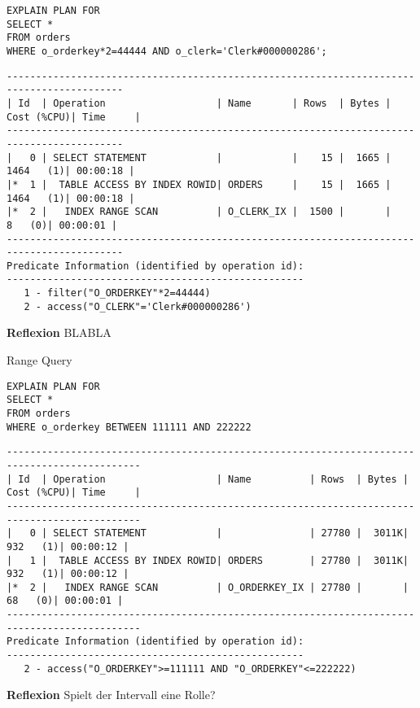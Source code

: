 \documentclass[10pt]{article}
\begin{document}
\begin{lstlisting}[style=sql]
EXPLAIN PLAN FOR
SELECT *
FROM orders
WHERE o_orderkey*2=44444 AND o_clerk='Clerk#000000286';
\end{lstlisting}
\begin{lstlisting}[style=queryexecutionplan]
------------------------------------------------------------------------------------------
| Id  | Operation                   | Name       | Rows  | Bytes | Cost (%CPU)| Time     |
------------------------------------------------------------------------------------------
|   0 | SELECT STATEMENT            |            |    15 |  1665 |  1464   (1)| 00:00:18 |
|*  1 |  TABLE ACCESS BY INDEX ROWID| ORDERS     |    15 |  1665 |  1464   (1)| 00:00:18 |
|*  2 |   INDEX RANGE SCAN          | O_CLERK_IX |  1500 |       |     8   (0)| 00:00:01 |
------------------------------------------------------------------------------------------
Predicate Information (identified by operation id):
---------------------------------------------------
   1 - filter("O_ORDERKEY"*2=44444)
   2 - access("O_CLERK"='Clerk#000000286')
\end{lstlisting}
\textbf{Reflexion} \newline
BLABLA

Range Query
\begin{lstlisting}[style=sql]
EXPLAIN PLAN FOR
SELECT *
FROM orders
WHERE o_orderkey BETWEEN 111111 AND 222222
\end{lstlisting}
\begin{lstlisting}[style=queryexecutionplan]
---------------------------------------------------------------------------------------------
| Id  | Operation                   | Name          | Rows  | Bytes | Cost (%CPU)| Time     |
---------------------------------------------------------------------------------------------
|   0 | SELECT STATEMENT            |               | 27780 |  3011K|   932   (1)| 00:00:12 |
|   1 |  TABLE ACCESS BY INDEX ROWID| ORDERS        | 27780 |  3011K|   932   (1)| 00:00:12 |
|*  2 |   INDEX RANGE SCAN          | O_ORDERKEY_IX | 27780 |       |    68   (0)| 00:00:01 |
---------------------------------------------------------------------------------------------
Predicate Information (identified by operation id):
---------------------------------------------------
   2 - access("O_ORDERKEY">=111111 AND "O_ORDERKEY"<=222222)
\end{lstlisting}
\textbf{Reflexion} \newline
Spielt der Intervall eine Rolle?
\end{document}
